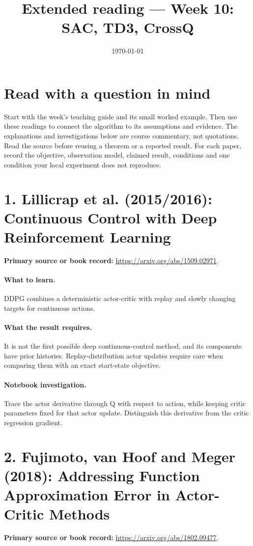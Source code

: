 \documentclass[11pt]{scrartcl}
\title{Extended reading --- Week 10: SAC, TD3, CrossQ}
\date{\today}
\begin{document}
\maketitle
\section*{Read with a question in mind}
Start with the week's teaching guide and its small worked example. Then use
these readings to connect the algorithm to its assumptions and evidence.
The explanations and investigations below are course commentary, not
quotations. Read the source before reusing a theorem or a reported result.
For each paper, record the objective, observation model, claimed result,
conditions and one condition your local experiment does not reproduce.

\section*{1. Lillicrap et al. (2015/2016): Continuous Control with Deep Reinforcement Learning}
\textbf{Primary source or book record:} \url{https://arxiv.org/abs/1509.02971}.

\paragraph{What to learn.} DDPG combines a deterministic actor-critic with replay and slowly changing targets for continuous actions.

\paragraph{What the result requires.} It is not the first possible deep continuous-control method, and its components have prior histories. Replay-distribution actor updates require care when comparing them with an exact start-state objective.

\paragraph{Notebook investigation.} Trace the actor derivative through Q with respect to action, while keeping critic parameters fixed for that actor update. Distinguish this derivative from the critic regression gradient.

\section*{2. Fujimoto, van Hoof and Meger (2018): Addressing Function Approximation Error in Actor-Critic Methods}
\textbf{Primary source or book record:} \url{https://arxiv.org/abs/1802.09477}.
\end{document}

